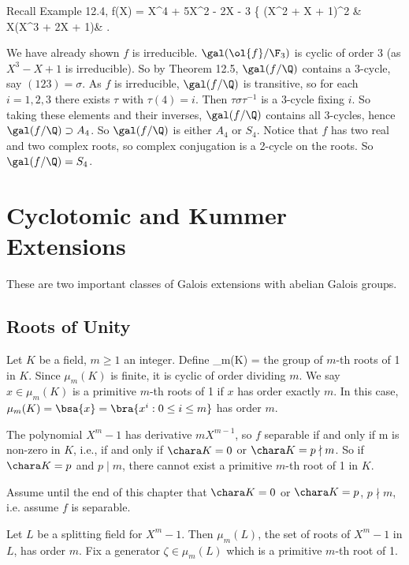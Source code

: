 Recall Example 12.4,
\be
f(X) = X^4 + 5X^2 - 2X - 3 \equiv \left\{
(X^2 + X + 1)^2 & \\
X(X^3 + 2X + 1)\quad \quad & 
\ea\right.
\ee

We have already shown $f$ is irreducible. $\gal( \ol{f}/\F_3)$ is cyclic of order 3 (as $X^3 - X + 1$ is irreducible). So by Theorem 12.5, $\gal(f/\Q)$ contains a 3-cycle, say $(1 2 3) = \sigma$. As $f$ is irreducible, $\gal(f/\Q)$ is transitive, so for each $i = 1, 2, 3$ there exists $\tau$ with $\tau(4) = i$. Then $\tau \sigma\tau^{-1}$ is a 3-cycle fixing $i$. So taking these elements and their inverses, $\gal(f/\Q)$ contains all 3-cycles, hence $\gal(f/\Q) \supset A_4$. So $\gal(f/\Q)$ is either $A_4$ or $S_4$. Notice that $f$ has two real and two complex roots, so complex conjugation is a 2-cycle on the
roots. So $\gal(f/\Q) = S_4$.

\section{Cyclotomic and Kummer Extensions}


These are two important classes of Galois extensions with abelian Galois groups.

\subsection{Roots of Unity}

Let $K$ be a field, $m \geq 1$ an integer. Define 
\be
\mu_m(K) = 
\ee
the group of $m$-th roots of 1 in $K$. Since $\mu_m(K)$ is finite, it is cyclic of order dividing $m$. We say $x \in \mu_m(K)$ is a primitive $m$-th roots of 1 if $x$ has order exactly $m$. In this case, $\mu_m(K) = \bsa{x} = \bra{x^i : 0 \leq  i \leq  m}$ has order $m$.

The polynomial $X^m - 1$ has derivative $mX^{m-1}$, so $f$ separable if and only if m is non-zero in $K$, i.e., if and only if $\chara K = 0$ or $\chara K = p \nmid m$. So if $\chara K = p$ and $p \mid m$, there cannot exist a primitive $m$-th root of 1 in $K$.

Assume until the end of this chapter that $\chara K = 0$ or $\chara K = p$, $p \nmid m$, i.e. assume $f$ is separable.

Let $L$ be a splitting field for $X^m -1$. Then $\mu_m(L)$, the set of roots of $X^m -1$ in $L$, has order $m$. Fix a generator $\zeta \in \mu_m(L)$ which is a primitive $m$-th root of 1.

